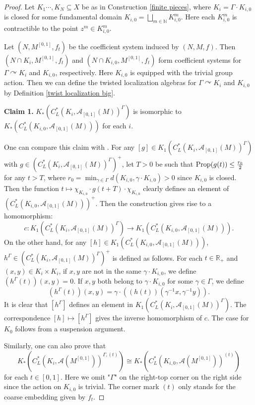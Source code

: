 \documentclass[11pt]{article}
\theoremstyle{definition}
\theoremstyle{plain}
\def\IN{\mathbb N}\def\IR{\mathbb R}\def\IE{\mathbb E}\def\IC{\mathbb C}\def\IL{\mathbb L}\def\IQ{\mathbb Q}\def\IA{\mathbb A}\def\IZ{\mathbb Z}
\def\A{\mathcal A}\def\C{\mathcal C}\def\B{\mathcal B}\def\E{\mathcal E}\def\O{\mathcal O}\def\h{\mathfrak h}\def\K{\mathcal K}\def\F{\mathcal F}\def\P{\mathcal P}\def\L{\mathcal L}\def\R{\mathcal R}\def\Q{\mathcal Q}\def\H{\mathcal H}\def\S{\mathcal S}\def\N{\mathcal N}\def\U{\mathcal U}\def\V{\mathcal V}
\def\prop{\textup{Prop}}
\def\Ga{\Gamma}
\def\car{\curvearrowright}
\begin{document}
\begin{proof}
Let $K_1\cdots,K_N\subseteq X$ be as in Construction \ref{finite pieces}, where $K_i=\Ga\cdot K_{i,0}$ is closed for some fundamental domain $K_{i,0}=\bigsqcup_{m\in\IN} K^m_{i,0}$. Here each $K_{i,0}^m$ is contractible to the point $z^m\in K_{i,0}^m$.

Let $(N,M^{[0,1]},f_t)$ be the coefficient system induced by $(N,M,f)$. Then $(N\cap K_i,M^{[0,1]},f_t)$ and $(N\cap K_{i,0},M^{[0,1]},f_t)$ form coefficient systems for $\Ga\car K_i$ and $K_{i,0}$, respectively. Here $K_{i,0}$ is equipped with the trivial group action. Then we can define the twisted localization algebras for $\Ga\car K_i$ and $K_{i,0}$ by Definition \ref{twist localization big}.

{\bf Claim 1.} $K_*(C^*_L(K_i,\A_{[0,1]}(M))^{\Ga})$ is isomorphic to $K_*(C^*_L(K_{i,0},\A_{[0,1]}(M)))$ for each $i$.

One can compare this claim with \cite[Lemma 2.3]{Yu1995}. For any $[g]\in K_1(C^*_L(K_i,\A_{[0,1]}(M))^{\Ga})$ with $g\in(C^*_L(K_i,\A_{[0,1]}(M))^{\Ga})^+$, let $T>0$ be such that $\prop(g(t))\leq\frac{r_0}2$ for any $t>T$, where $r_0=\min_{\gamma\in\Ga} d(K_{i,0},\gamma\cdot K_{i,0})>0$ since $K_{i,0}$ is closed. Then the function $t\mapsto\chi_{K_{i,0}}\cdot g(t+T)\cdot\chi_{K_{i,0}}$ clearly defines an element of $(C^*_L(K_{i,0},\A_{[0,1]}(M)))^+$. Then the construction gives rise to a homomorphism:
$$c:K_1(C^*_L(K_i,\A_{[0,1]}(M))^{\Ga})\to K_1(C^*_L(K_{i,0},\A_{[0,1]}(M))).$$
On the other hand, for any $[h]\in K_1(C^*_L(K_{i,0},\A_{[0,1]}(M)))$, $h^{\Ga}\in (C^*_L(K_i,\A_{[0,1]}(M))^{\Ga})^+$ is defined as follows. For each $t\in\IR_+$ and $(x,y)\in K_i\times K_i$, if $x,y$ are not in the same $\gamma\cdot K_{i,0}$, we define $(h^{\Ga}(t))(x,y)=0$. If $x,y$ both belong to $\gamma\cdot K_{i,0}$ for some $\gamma\in\Ga$, we define
$$(h^{\Ga}(t))(x,y)=\gamma\cdot\left((h(t))(\gamma^{-1}x,\gamma^{-1}y) \right).$$
It is clear that $[h^{\Ga}]$ defines an element in $K_1(C^*_L(K_i,\A_{[0,1]}(M))^{\Ga})$. The correspondence $[h]\mapsto [h^{\Ga}]$ gives the inverse homomorphism of $c$. The case for $K_0$ follows from a suspension argument.

Similarly, one can also prove that
$$K_*(C^*_L(K_i,\A(M^{[0,1]}))^{\Ga,(t)})\cong K_*(C^*_L(K_{i,0},\A(M^{[0,1]}))^{(t)})$$
for each $t\in[0,1]$. Here we omit "$\Ga$" on the right-top corner on the right side since the action on $K_{i,0}$ is trivial. The corner mark $(t)$ only stands for the coarse embedding given by $f_t$.


\end{proof}
\end{document}
